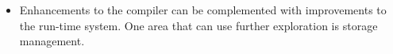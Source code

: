 \begin{itemize}
\item Enhancements to the compiler can be complemented with
improvements to the run-time system. One area that can use further
exploration is storage management.

\end{itemize}

\clearpage
\bigskip

